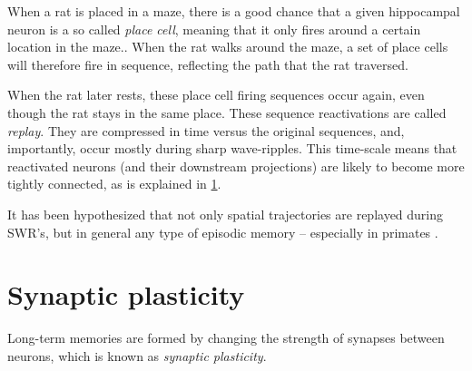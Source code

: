 
When a rat is placed in a maze, there is a good chance that a given hippocampal neuron is a so called \emph{place cell}, meaning that it only fires around a certain location in the maze.\footnotemark{}. When the rat walks around the maze, a set of place cells will therefore fire in sequence, reflecting the path that the rat traversed.


When the rat later rests, these place cell firing sequences occur again, even though the rat stays in the same place. These sequence reactivations are called \emph{replay}. They are compressed in time versus the original sequences, and, importantly, occur mostly during sharp wave-ripples. This time-scale means that reactivated neurons (and their downstream projections) are likely to become more tightly connected, as is explained in \cref{sec:synaptic-plasticity}.

It has been hypothesized that not only spatial trajectories are replayed during SWR's, but in general any type of episodic memory -- especially in primates \cite{Girardeau2011}.




\section{Synaptic plasticity}
\label{sec:synaptic-plasticity}

Long-term memories are formed by changing the strength of synapses between neurons, which is known as \emph{synaptic plasticity}.\footnotemark{}

